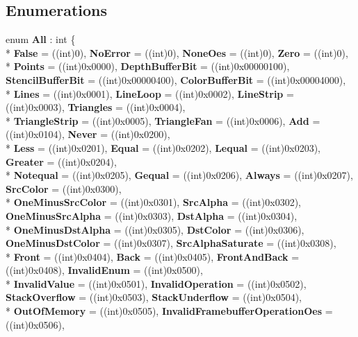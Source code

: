\subsection*{Enumerations}
\begin{DoxyCompactItemize}
\item 
enum {\bfseries All} \-: int \{ \\*
{\bfseries False} = ((int)0), 
{\bfseries No\-Error} = ((int)0), 
{\bfseries None\-Oes} = ((int)0), 
{\bfseries Zero} = ((int)0), 
\\*
{\bfseries Points} = ((int)0x0000), 
{\bfseries Depth\-Buffer\-Bit} = ((int)0x00000100), 
{\bfseries Stencil\-Buffer\-Bit} = ((int)0x00000400), 
{\bfseries Color\-Buffer\-Bit} = ((int)0x00004000), 
\\*
{\bfseries Lines} = ((int)0x0001), 
{\bfseries Line\-Loop} = ((int)0x0002), 
{\bfseries Line\-Strip} = ((int)0x0003), 
{\bfseries Triangles} = ((int)0x0004), 
\\*
{\bfseries Triangle\-Strip} = ((int)0x0005), 
{\bfseries Triangle\-Fan} = ((int)0x0006), 
{\bfseries Add} = ((int)0x0104), 
{\bfseries Never} = ((int)0x0200), 
\\*
{\bfseries Less} = ((int)0x0201), 
{\bfseries Equal} = ((int)0x0202), 
{\bfseries Lequal} = ((int)0x0203), 
{\bfseries Greater} = ((int)0x0204), 
\\*
{\bfseries Notequal} = ((int)0x0205), 
{\bfseries Gequal} = ((int)0x0206), 
{\bfseries Always} = ((int)0x0207), 
{\bfseries Src\-Color} = ((int)0x0300), 
\\*
{\bfseries One\-Minus\-Src\-Color} = ((int)0x0301), 
{\bfseries Src\-Alpha} = ((int)0x0302), 
{\bfseries One\-Minus\-Src\-Alpha} = ((int)0x0303), 
{\bfseries Dst\-Alpha} = ((int)0x0304), 
\\*
{\bfseries One\-Minus\-Dst\-Alpha} = ((int)0x0305), 
{\bfseries Dst\-Color} = ((int)0x0306), 
{\bfseries One\-Minus\-Dst\-Color} = ((int)0x0307), 
{\bfseries Src\-Alpha\-Saturate} = ((int)0x0308), 
\\*
{\bfseries Front} = ((int)0x0404), 
{\bfseries Back} = ((int)0x0405), 
{\bfseries Front\-And\-Back} = ((int)0x0408), 
{\bfseries Invalid\-Enum} = ((int)0x0500), 
\\*
{\bfseries Invalid\-Value} = ((int)0x0501), 
{\bfseries Invalid\-Operation} = ((int)0x0502), 
{\bfseries Stack\-Overflow} = ((int)0x0503), 
{\bfseries Stack\-Underflow} = ((int)0x0504), 
\\*
{\bfseries Out\-Of\-Memory} = ((int)0x0505), 
{\bfseries Invalid\-Framebuffer\-Operation\-Oes} = ((int)0x0506), 

\end{DoxyCompactItemize}
